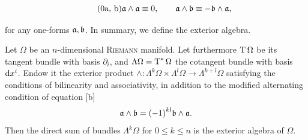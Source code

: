 \begin{subequations}\label{eq:exterior_product}
        \begin{equation}\tag{\theequation{a, b}}
                \afrak\wedge\afrak \equiv 0, \qquad \afrak\wedge\bfrak \equiv -\bfrak\wedge\afrak,
        \end{equation}
\end{subequations}

\noindent
for any one-forms $\mathfrak{a}, \mathfrak{b}$.
In summary, we define the exterior algebra.

\begin{definition}
  Let $\Omega$ be an $n$-dimensional \textsc{Riemann} manifold.
  Let furthermore $\operatorname{T}\Omega$ be its tangent bundle with basis $\partial_i$, and $\Lambda\Omega = \operatorname{T}^{\ast}\Omega$ the cotangent bundle with basis $\mathrm{d} x^{i}$.
  Endow it the exterior product $\wedge: \Lambda^{k}\Omega \times \Lambda^{l}\Omega \to \Lambda^{k + l}\Omega$ satisfying the conditions of bilinearity and associativity, in addition to the modified alternating condition of equation \subeqref{\ref{eq:exterior_product}}[b]
  \begin{equation}
    \mathfrak{a} \wedge \mathfrak{b} = {(-1)}^{kl} \mathfrak{b} \wedge \mathfrak{a}.
  \end{equation}
  Then the direct sum of bundles $\Lambda^k \Omega$ for $0 \leq k \leq n$  is the exterior algebra of $\Omega$.
\end{definition}

